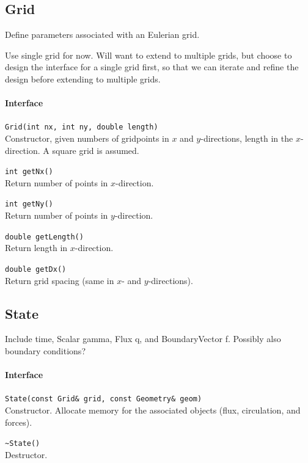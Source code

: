 \documentclass[11pt]{article}
\let\code\lstinline
\begin{document}
\subsection{Grid}
Define parameters associated with an Eulerian grid.

Use single grid for now.  Will want to extend to multiple grids, but choose to design the interface for a single grid first, so that we can iterate and refine the design before extending to multiple grids.

\paragraph{Interface}
\begin{description}
	\item \code|Grid(int nx, int ny, double length)|\\
		Constructor, given numbers of gridpoints in $x$ and $y$-directions, length in the $x$-direction.  A square grid is assumed.
	\item \code|int getNx()|\\
		Return number of points in $x$-direction.
	\item \code|int getNy()|\\
		Return number of points in $y$-direction.
	\item \code|double getLength()|\\
		Return length in $x$-direction.
	\item \code|double getDx()|\\
		Return grid spacing (same in $x$- and $y$-directions).
		
\end{description}


\subsection{State}
Include time, Scalar gamma, Flux q, and BoundaryVector f.  Possibly also boundary conditions?

\paragraph{Interface}
\begin{description}
	\item \code|State(const Grid& grid, const Geometry& geom)|\\
		Constructor.  Allocate memory for the associated objects (flux, circulation, and forces).
	\item \code|~State()|\\
		Destructor.
\end{description}
\end{document}
